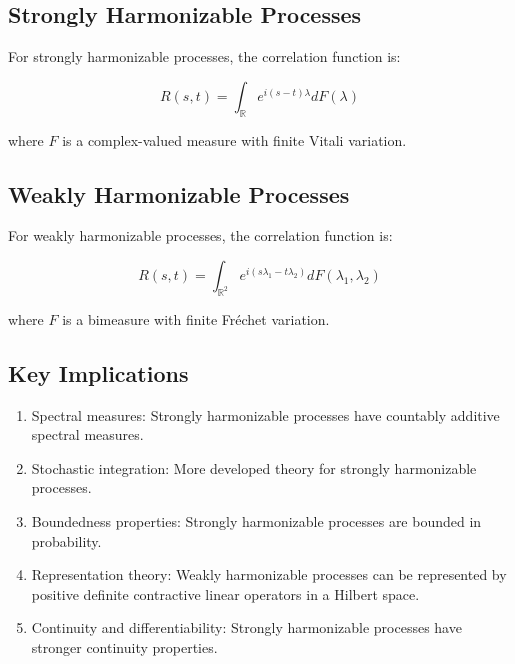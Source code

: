 \documentclass[12pt]{article}
\begin{document}
\subsection{Strongly Harmonizable Processes}
For strongly harmonizable processes, the correlation function is:

\[R(s,t)=\int_{\mathbb{R}}e^{i(s-t)\lambda}dF(\lambda)\]

where $F$ is a complex-valued measure with finite Vitali variation.

\subsection{Weakly Harmonizable Processes}
For weakly harmonizable processes, the correlation function is:

\[R(s,t)=\int_{\mathbb{R}^2}e^{i(s\lambda_1 -t\lambda_2)}dF(\lambda_1,\lambda_2)\]

where $F$ is a bimeasure with finite Fr\'echet variation.

\subsection{Key Implications}
\begin{enumerate}
    \item Spectral measures: Strongly harmonizable processes have countably additive spectral measures.
    \item Stochastic integration: More developed theory for strongly harmonizable processes.
    \item Boundedness properties: Strongly harmonizable processes are bounded in probability.
    \item Representation theory: Weakly harmonizable processes can be represented by positive definite contractive linear operators in a Hilbert space.
    \item Continuity and differentiability: Strongly harmonizable processes have stronger continuity properties.
\end{enumerate}
\end{document}
